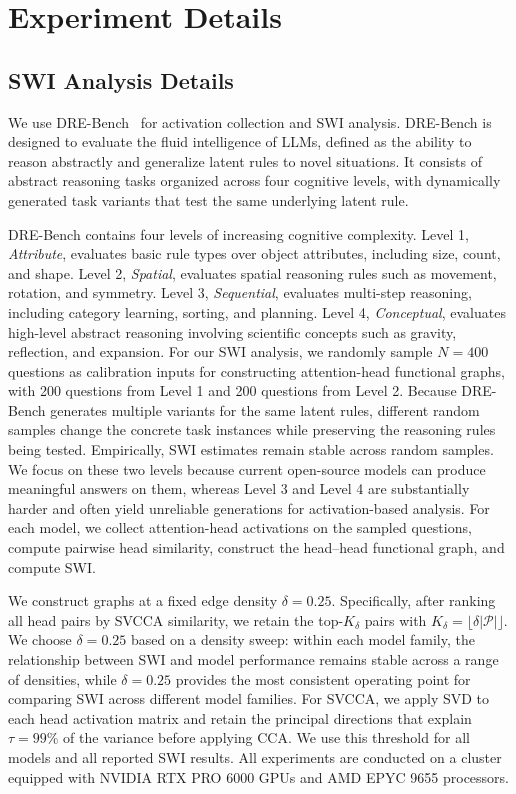 \section{Experiment Details}
\label{app:swa_expdetails}
\subsection{SWI Analysis Details}
\label{sec:swa_swi_analysis_details}

We use DRE-Bench~\cite{yang2025truly} for activation collection and SWI analysis. DRE-Bench is designed to evaluate the fluid intelligence of LLMs, defined as the ability to reason abstractly and generalize latent rules to novel situations. It consists of abstract reasoning tasks organized across four cognitive levels, with dynamically generated task variants that test the same underlying latent rule.

DRE-Bench contains four levels of increasing cognitive complexity. Level 1, \textit{Attribute}, evaluates basic rule types over object attributes, including size, count, and shape. Level 2, \textit{Spatial}, evaluates spatial reasoning rules such as movement, rotation, and symmetry. Level 3, \textit{Sequential}, evaluates multi-step reasoning, including category learning, sorting, and planning. Level 4, \textit{Conceptual}, evaluates high-level abstract reasoning involving scientific concepts such as gravity, reflection, and expansion.
For our SWI analysis, we randomly sample $N=400$ questions as calibration inputs for constructing attention-head functional graphs, with 200 questions from Level 1 and 200 questions from Level 2. Because DRE-Bench generates multiple variants for the same latent rules, different random samples change the concrete task instances while preserving the reasoning rules being tested. Empirically, SWI estimates remain stable across random samples. We focus on these two levels because current open-source models can produce meaningful answers on them, whereas Level 3 and Level 4 are substantially harder and often yield unreliable generations for activation-based analysis. For each model, we collect attention-head activations on the sampled questions, compute pairwise head similarity, construct the head--head functional graph, and compute SWI.


We construct graphs at a fixed edge density $\delta=0.25$. Specifically, after ranking all head pairs by SVCCA similarity, we retain the top-$K_\delta$ pairs with $K_\delta=\lfloor \delta |\mathcal{P}| \rfloor$. We choose $\delta=0.25$ based on a density sweep: within each model family, the relationship between SWI and model performance remains stable across a range of densities, while $\delta=0.25$ provides the most consistent operating point for comparing SWI across different model families. For SVCCA, we apply SVD to each head activation matrix and retain the principal directions that explain $\tau=99\%$ of the variance before applying CCA. We use this threshold for all models and all reported SWI results. All experiments are conducted on a cluster equipped with NVIDIA RTX PRO 6000 GPUs and AMD EPYC 9655 processors.

